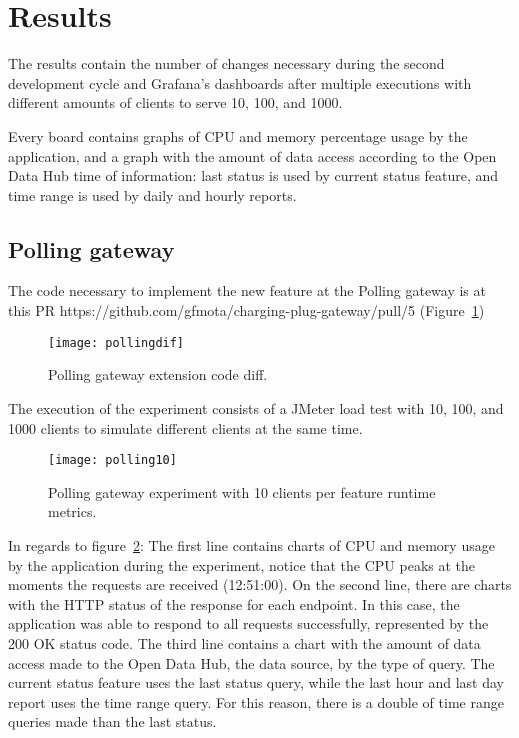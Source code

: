 \section{Results}
\label{sec:results}

The results contain the number of changes necessary during the second development cycle and Grafana's dashboards after multiple executions with different amounts of clients to serve 10, 100, and 1000.

Every board contains graphs of CPU and memory percentage usage by the application, and a graph with the amount of data access according to the Open Data Hub time of information: last status is used by current status feature, and time range is used by daily and hourly reports.

\subsection*{Polling gateway}
\label{sec:pollingresult}

The code necessary to implement the new feature at the Polling gateway is at this PR https://github.com/gfmota/charging-plug-gateway/pull/5 (Figure~\ref{fig:pollingdif})

\begin{figure}
    \centering
    \texttt{[image: pollingdif]}
    \caption{Polling gateway extension code diff.\label{fig:pollingdif}}
\end{figure}

The execution of the experiment consists of a JMeter load test with 10, 100, and 1000 clients to simulate different clients at the same time.

\begin{figure}
    \centering
    \texttt{[image: polling10]}
    \caption{Polling gateway experiment with 10 clients per feature runtime metrics.\label{fig:polling10}}
\end{figure}

In regards to figure~\ref{fig:polling10}: The first line contains charts of CPU and memory usage by the application during the experiment, notice that the CPU peaks at the moments the requests are received (12:51:00). On the second line, there are charts with the HTTP status of the response for each endpoint. In this case, the application was able to respond to all requests successfully, represented by the 200 OK status code. The third line contains a chart with the amount of data access made to the Open Data Hub, the data source, by the type of query. The current status feature uses the last status query, while the last hour and last day report uses the time range query. For this reason, there is a double of time range queries made than the last status. 


